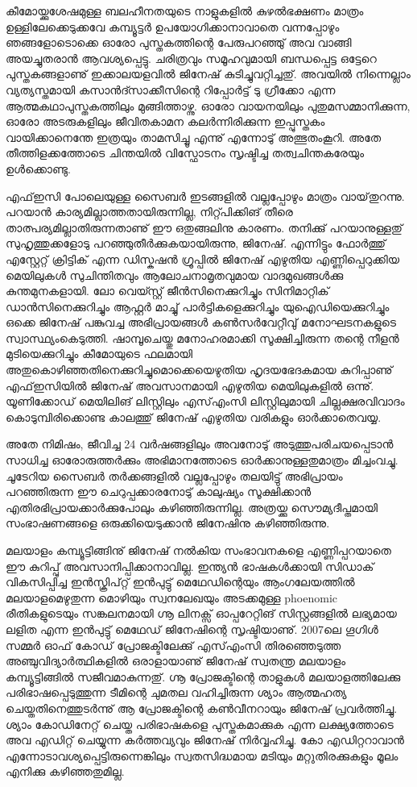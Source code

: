 കീമോയ്ക്കുശേഷമുള്ള ബലഹീനതയുടെ നാളുകളില്‍ കുഴല്‍ഭക്ഷണം മാത്രം ഉള്ളിലേക്കെടുക്കവേ കമ്പ്യൂട്ടര്‍ ഉപയോഗിക്കാനാവാതെ 
വന്നപ്പോഴും ഞങ്ങളോടൊക്കെ ഓരോ പുസ്തകത്തിന്റെ പേരുപറഞ്ഞു് അവ വാങ്ങി അയച്ചുതരാന്‍ ആവശ്യപ്പെട്ടു. ചരിത്രവും 
സമൂഹവുമായി ബന്ധപ്പെട്ട ഒട്ടേറെ പുസ്തകങ്ങളാണു് ഇക്കാലയളവില്‍ ജിനേഷ് കുടിച്ചുവറ്റിച്ചതു്. അവയില്‍ നിന്നെല്ലാം 
വ്യത്യസ്തമായി കസാന്‍ദ്സാക്കീസിന്റെ റിപ്പോര്‍ട്ട് ടു ഗ്രീക്കോ എന്ന ആത്മകഥാപുസ്തകത്തിലും മുങ്ങിത്താഴ്ന്നു. ഓരോ വായനയിലും 
പുതുമസമ്മാനിക്കുന്ന, ഓരോ അടരുകളിലും ജീവിതകാമന കലര്‍ന്നിരിക്കുന്ന ഇപ്പുസ്തകം വായിക്കാനെന്തേ ഇത്രയും താമസിച്ചൂ 
എന്നു് എന്നോടു് അത്ഭുതംകൂറി.   അതേ തീത്തിളക്കത്തോടെ ചിന്തയില്‍ വിസ്ഫോടനം സൃഷ്ടിച്ച തത്വചിന്തകരേയും ഉള്‍ക്കൊണ്ടു.

എഫ്ഇസി പോലെയുള്ള സൈബര്‍ ഇടങ്ങളില്‍ വല്ലപ്പോഴും മാത്രം വായ്‌തുറന്നു. പറയാന്‍ കാര്യമില്ലാത്തതായിരുന്നില്ല, 
നിറ്റ്പിക്കിങ് തീരെ താത്പര്യമില്ലാതിരുന്നതാണു് ഈ ഒതുങ്ങലിനു കാരണം. തനിക്കു് പറയാനുള്ളതു് സുഹൃത്തുക്കളോടു 
പറഞ്ഞുതീര്‍ക്കുകയായിരുന്നു, ജിനേഷ്. എന്നിട്ടും ഫോര്‍ത്തു് എസ്റ്റേറ്റ് ക്രിട്ടിക്‍ എന്ന ഡിസ്കഷന്‍ ഗ്രൂപ്പില്‍ ജിനേഷ് എഴുതിയ 
എണ്ണിപ്പെറുക്കിയ മെയിലുകള്‍ സുചിന്തിതവും ആലോചനാമൃതവുമായ വാദമുഖങ്ങള്‍ക്കു കുന്തമുനകളായി. ലോ വെയ്സ്റ്റ് 
ജീന്‍സിനെക്കുറിച്ചും സിനിമാറ്റിക്‍ ഡാന്‍സിനെക്കുറിച്ചും ആഫ്റ്റര്‍ മാച്ചു് പാര്‍ട്ടികളെക്കുറിച്ചും യുഐഡിയെക്കുറിച്ചും ഒക്കെ 
ജിനേഷ് പങ്കുവച്ച അഭിപ്രായങ്ങള്‍ കണ്‍സര്‍വേറ്റീവു് മനോഘടനകളുടെ സ്വാസ്ഥ്യംകെടുത്തി. ഷാമ്പൂചെയ്തു മനോഹരമാക്കി 
സൂക്ഷിച്ചിരുന്ന തന്റെ നീളന്‍ മുടിയെക്കുറിച്ചും കീമോയുടെ ഫലമായി അതുകൊഴിഞ്ഞതിനെക്കുറിച്ചുമൊക്കെയെഴുതിയ 
ഹൃദയഭേദകമായ കുറിപ്പാണു് എഫ്ഇസിയില്‍ ജിനേഷ് അവസാനമായി എഴുതിയ മെയിലുകളില്‍ ഒന്നു്. യൂണിക്കോഡ് 
മെയിലിങ് ലിസ്റ്റിലും എസ്എംസി ലിസ്റ്റിലുമായി ചില്ലക്ഷരവിവാദം കൊടുമ്പിരിക്കൊണ്ട കാലത്തു് ജിനേഷ് എഴുതിയ വരികളും 
ഓര്‍ക്കാതെവയ്യ.

അതേ നിമിഷം, ജീവിച്ച 24 വര്‍ഷങ്ങളിലും അവനോടു് അടുത്തുപരിചയപ്പെടാന്‍ സാധിച്ച ഓരോരുത്തര്‍ക്കും അഭിമാനത്തോടെ 
ഓര്‍ക്കാനുള്ളതുമാത്രം മിച്ചംവച്ചു. ചൂടേറിയ സൈബര്‍ തര്‍ക്കങ്ങളില്‍ വല്ലപ്പോഴും തലയിട്ടു് അഭിപ്രായം പറഞ്ഞിരുന്ന ഈ 
ചെറുപ്പക്കാരനോടു് കാലുഷ്യം സൂക്ഷിക്കാന്‍ എതിരഭിപ്രായക്കാര്‍ക്കുപോലും കഴിഞ്ഞിരുന്നില്ല. അത്രയ്ക്കു സൌമ്യദീപ്തമായി 
സംഭാഷണങ്ങളെ ഒരുക്കിയെടുക്കാന്‍ ജിനേഷിനു കഴിഞ്ഞിരുന്നു.

മലയാളം കമ്പ്യൂട്ടിങ്ങിനു് ജിനേഷ് നല്‍കിയ സംഭാവനകളെ എണ്ണിപ്പറയാതെ ഈ കുറിപ്പു് അവസാനിപ്പിക്കാനാവില്ല. 
ഇന്ത്യന്‍ ഭാഷകള്‍ക്കായി സിഡാക്‍ വികസിപ്പിച്ച ഇന്‍സ്ക്രിപ്റ്റ് ഇന്‍പുട്ടു് മെഥേഡിന്റെയും ആംഗലേയത്തില്‍ മലയാളമെഴുതുന്ന 
മൊഴിയും സ്വനലേഖയും അടക്കമുള്ള phoenomic രീതികളുടെയും സങ്കലനമായി ഗ്നൂ ലിനക്സ് ഓപ്പറേറ്റിങ് സിസ്റ്റങ്ങളില്‍ ലഭ്യമായ 
ലളിത എന്ന ഇന്‍പുട്ടു് മെഥേഡ് ജിനേഷിന്റെ സൃഷ്ടിയാണു്. 2007ലെ ഗൂഗിള്‍ സമ്മര്‍ ഓഫ് കോഡ് പ്രോജക്ടിലേക്കു് എസ്എംസി 
തിരഞ്ഞെടുത്ത അഞ്ചുവിദ്യാര്‍ത്ഥികളില്‍ ഒരാളായാണു് ജിനേഷ് സ്വതന്ത്ര മലയാളം കമ്പ്യൂട്ടിങ്ങില്‍ സജീവമാകുന്നതു്. ഗ്നൂ 
പ്രോജക്ടിന്റെ താളുകള്‍ മലയാളത്തിലേക്കു പരിഭാഷപ്പെടുത്തുന്ന ടീമിന്റെ ചുമതല വഹിച്ചിരുന്ന ശ്യാം ആത്മഹത്യ 
ചെയ്തതിനെത്തുടര്‍ന്നു് ആ പ്രോജക്ടിന്റെ കണ്‍വീനറായും ജിനേഷ് പ്രവര്‍ത്തിച്ചു. ശ്യാം കോഡിനേറ്റ് ചെയ്ത പരിഭാഷകളെ 
പുസ്തകമാക്കുക എന്ന ലക്ഷ്യത്തോടെ അവ എഡിറ്റ് ചെയ്യുന്ന കര്‍ത്തവ്യവും ജിനേഷ് നിര്‍വ്വഹിച്ചു. കോ എഡിറ്ററാവാന്‍ 
എന്നോടാവശ്യപ്പെട്ടിരുന്നെങ്കിലും സ്വതസിദ്ധമായ മടിയും മറ്റുതിരക്കുകളും മൂലം എനിക്കു കഴിഞ്ഞതുമില്ല.

